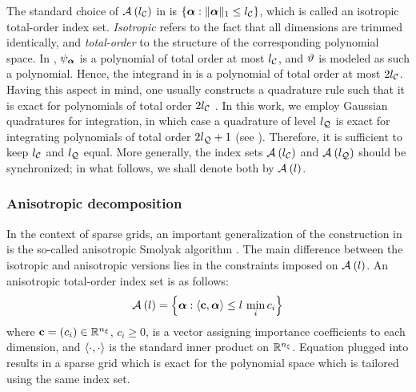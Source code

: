 The standard choice of $\multiindexSet{\nclevel}$ in  is $\{ \multiindex: \norm[1]{\multiindex} \leq \nclevel \}$, which is called an isotropic total-order index set.
\emph{Isotropic} refers to the fact that all dimensions are trimmed identically, and \emph{total-order} to the structure of the corresponding polynomial space.
In , $\polynomial_{\multiindex}$ is a polynomial of total order at most $\nclevel$, and $\w$ is modeled as such a polynomial.
Hence, the integrand in  is a polynomial of total order at most $2 \nclevel$.
Having this aspect in mind, one usually constructs a quadrature rule such that it is exact for polynomials of total order $2 \nclevel$ \cite{eldred2008}.
In this work, we employ Gaussian quadratures for integration, in which case a quadrature of level $\nqlevel$ is exact for integrating polynomials of total order $2 \nqlevel + 1$ (see ).
Therefore, it is sufficient to keep $\nclevel$ and $\nqlevel$ equal.
More generally, the index sets $\multiindexSet{\nclevel}$ and $\multiindexSet{\nqlevel}$ should be synchronized; in what follows, we shall denote both by $\multiindexSet{\level}$.

\subsubsection{Anisotropic decomposition}
In the context of sparse grids, an important generalization of the construction in  is the so-called anisotropic Smolyak algorithm \cite{nobile2008}.
The main difference between the isotropic and anisotropic versions lies in the constraints imposed on $\quadratureMultiindexSet{\level}$.
An anisotropic total-order index set is as follows:
\begin{equation} \elab{anisotropic-total-order-index-set}
  \chaosMultiindexSet{\level} = \left\{ \multiindex: \innerProduct{\dimensionAnisotropy, \multiindex} \leq \level \, \min_i c_i \right\}
\end{equation}
where $\dimensionAnisotropy = (c_i) \in \real^\nvars$, $c_i \geq 0$, is a vector assigning importance coefficients to each dimension, and $\innerProduct{\cdot, \cdot}$ is the standard inner product on $\real^\nvars$.
Equation  plugged into  results in a sparse grid which is exact for the polynomial space which is tailored using the same index set.


